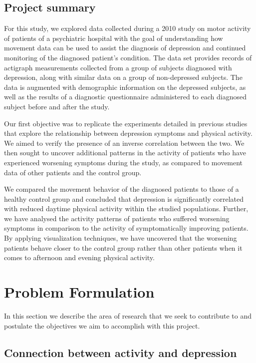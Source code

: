 \documentclass[12pt]{article}
\begin{document}
\subsection{Project summary}

For this study, we explored data collected during a 2010 study on motor activity of patients of a psychiatric hospital with the goal of understanding how movement data can be used to assist the diagnosis of depression and continued monitoring of the diagnosed patient's condition. The data set provides records of actigraph measurements collected from a group of subjects diagnosed with depression, along with similar data on a group of non-depressed subjects. The data is augmented with demographic information on the depressed subjects, as well as the results of a diagnostic questionnaire administered to each diagnosed subject before and after the study.

Our first objective was to replicate the experiments detailed in previous studies that explore the relationship between depression symptoms and physical activity. We aimed to verify the presence of an inverse correlation between the two. We then sought to uncover additional patterns in the activity of patients who have experienced worsening symptoms during the study, as compared to movement data of other patients and the control group.

We compared the movement behavior of the diagnosed patients to those of a healthy control group and concluded that depression is significantly correlated with reduced daytime physical activity within the studied populations. Further, we have analysed the activity patterns of patients who suffered worsening symptoms in comparison to the activity of symptomatically improving patients. By applying visualization techniques, we have uncovered that the worsening patients behave closer to the control group rather than other patients when it comes to afternoon and evening physical activity.

\section{Problem Formulation}

In this section we describe the area of research that we seek to contribute to and postulate the objectives we aim to accomplish with this project.

\subsection{Connection between activity and depression}
\end{document}
